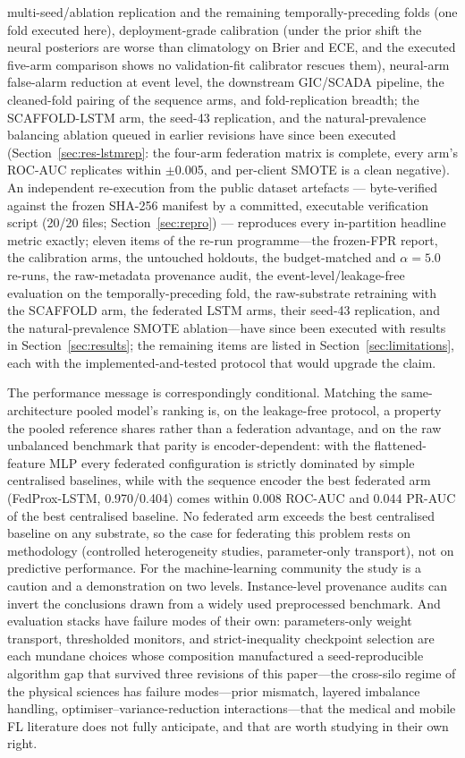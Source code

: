 multi-seed/ablation replication and the remaining temporally-preceding
folds (one fold executed here), deployment-grade
calibration (under the prior shift the neural posteriors
are worse than climatology on Brier and ECE, and the executed
five-arm comparison shows no validation-fit calibrator rescues them),
neural-arm false-alarm reduction at event level,
the downstream GIC/SCADA pipeline, the cleaned-fold pairing of the
sequence arms, and fold-replication breadth; the SCAFFOLD-LSTM arm,
the seed-43 replication, and the natural-prevalence balancing
ablation queued in earlier revisions have since been executed
(Section~\ref{sec:res-lstmrep}: the four-arm federation matrix is
complete, every arm's ROC-AUC replicates within $\pm$0.005, and
per-client SMOTE is a clean negative).
An independent re-execution from the public dataset artefacts ---
byte-verified against the frozen SHA-256 manifest by a committed,
executable verification script (20/20 files; Section~\ref{sec:repro})
--- reproduces every in-partition headline metric exactly; eleven items of the re-run
programme---the frozen-FPR report, the calibration arms, the
untouched holdouts, the budget-matched and $\alpha{=}5.0$ re-runs,
the raw-metadata provenance audit, the event-level/leakage-free
evaluation on the temporally-preceding fold, the raw-substrate
retraining with the SCAFFOLD arm, the federated LSTM arms, their
seed-43 replication, and the natural-prevalence SMOTE
ablation---have
since been executed with results in Section~\ref{sec:results}; the
remaining
items are listed in
Section~\ref{sec:limitations}, each with the implemented-and-tested
protocol that would upgrade the claim.

The performance message is correspondingly conditional. Matching the
same-architecture pooled model's ranking is, on the leakage-free
protocol, a property the pooled reference shares rather than a
federation advantage, and on the raw unbalanced benchmark that parity
is encoder-dependent: with the flattened-feature MLP every federated
configuration is strictly dominated by simple centralised baselines,
while with the sequence encoder the best federated arm
(FedProx-LSTM, 0.970/0.404) comes within 0.008 ROC-AUC and 0.044
PR-AUC of the best centralised baseline. No federated arm exceeds the
best centralised baseline on any substrate, so the case for federating
this problem rests on methodology (controlled heterogeneity studies,
parameter-only transport), not on predictive performance. For the machine-learning community the study is a caution and a
demonstration on two levels. Instance-level provenance audits can
invert the conclusions drawn from a widely used preprocessed
benchmark. And evaluation stacks have failure modes of their own:
parameters-only weight transport, thresholded monitors, and
strict-inequality checkpoint selection are each mundane choices whose
composition manufactured a seed-reproducible algorithm gap that
survived three revisions of this paper---the cross-silo regime of the
physical sciences has failure modes---prior mismatch, layered
imbalance handling, optimiser--variance-reduction interactions---that
the medical and mobile FL literature does not fully anticipate, and
that are worth studying in their own right.
